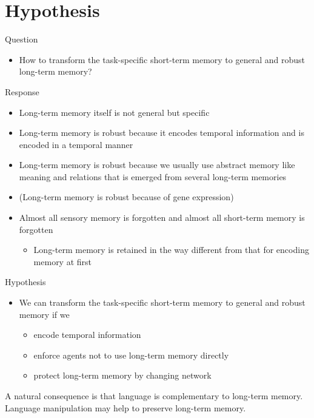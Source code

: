 \documentclass[12pt]{article}
\begin{document}
\section{Hypothesis}

Question
\begin{itemize}
    \item How to transform the task-specific short-term memory to general and robust long-term memory?
\end{itemize}
Response
\begin{itemize}
    \item Long-term memory itself is not general but specific
    \item Long-term memory is robust because it encodes temporal information and is encoded in a temporal manner
    \item Long-term memory is robust because we usually use abstract memory like meaning and relations that is emerged from several long-term memories
    \item (Long-term memory is robust because of gene expression)
    \item Almost all sensory memory is forgotten and almost all short-term memory is forgotten
    \begin{itemize}
        \item Long-term memory is retained in the way different from that for encoding memory at first
    \end{itemize}
\end{itemize}
Hypothesis
\begin{itemize}
    \item We can transform the task-specific short-term memory to general and robust memory if we
    \begin{itemize}
        \item encode temporal information
        \item enforce agents not to use long-term memory directly
        \item protect long-term memory by changing network
    \end{itemize}
\end{itemize}
A natural consequence is that language is complementary to long-term memory. Language manipulation may help 
to preserve long-term memory.
\end{document}
